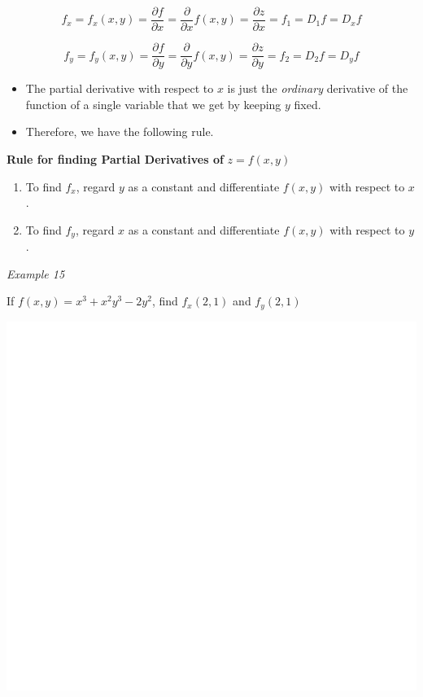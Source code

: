 \documentclass[]{book}
\begin{document}
\[f_x=f_x(x,y)= \frac{\partial f}{\partial x}= \frac{\partial }{\partial x}f(x,y)= \frac{\partial z }{\partial x}= f_1=D_1f= D_xf \]

\[f_y=f_y(x,y)= \frac{\partial f}{\partial y}= \frac{\partial }{\partial y}f(x,y)= \frac{\partial z }{\partial y}= f_2=D_2f= D_yf \]

\begin{itemize}
\item
  The partial derivative with respect to \(x\) is just the \emph{ordinary} derivative of the function of a single variable that we get by keeping \(y\) fixed.
\item
  Therefore, we have the following rule.
\end{itemize}

\textbf{Rule for finding Partial Derivatives of } \(z=f(x,y)\)

\begin{enumerate}
\def\labelenumi{\arabic{enumi}.}
\item
  To find \(f_x\), regard \(y\) as a constant and differentiate \(f(x,y)\) with respect to \(x\).
\item
  To find \(f_y\), regard \(x\) as a constant and differentiate \(f(x,y)\) with respect to \(y\).
\end{enumerate}

\emph{Example 15}

If \(f(x,y)=x^3+x^2y^3-2y^2\), find \(f_x(2,1)\) and \(f_y(2,1)\)

\begin{center}\includegraphics[width=1\linewidth]{figure/LB25b-1} \end{center}
\end{document}
